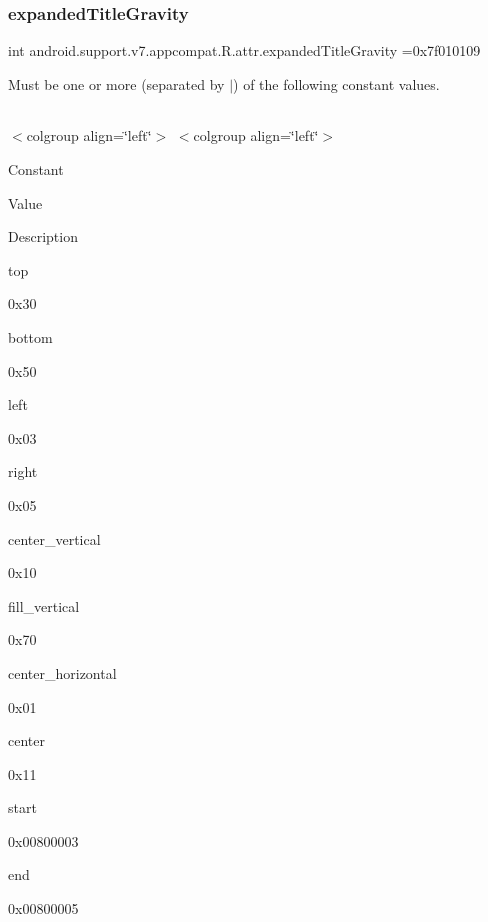 \subsubsection{\texorpdfstring{expanded\+Title\+Gravity}{expandedTitleGravity}}
{\footnotesize\ttfamily int android.\+support.\+v7.\+appcompat.\+R.\+attr.\+expanded\+Title\+Gravity =0x7f010109\hspace{0.3cm}{\ttfamily [static]}}

Must be one or more (separated by \textquotesingle{}$\vert$\textquotesingle{}) of the following constant values.

\tabulinesep=1mm
\begin{longtabu} spread 0pt [c]{*{0}{|X[-1]}|}
\hline
\end{longtabu}
$<$colgroup align=\char`\"{}left\char`\"{}$>$ $<$colgroup align=\char`\"{}left\char`\"{}$>$ 

Constant

Value

Description 

{\ttfamily top}

0x30

{\ttfamily bottom}

0x50

{\ttfamily left}

0x03

{\ttfamily right}

0x05

{\ttfamily center\+\_\+vertical}

0x10

{\ttfamily fill\+\_\+vertical}

0x70

{\ttfamily center\+\_\+horizontal}

0x01

{\ttfamily center}

0x11

{\ttfamily start}

0x00800003

{\ttfamily end}

0x00800005\mbox{\label{classandroid_1_1support_1_1v7_1_1appcompat_1_1R_1_1attr_a7b201fb107f130eb06fe70e6910942ca}} 
